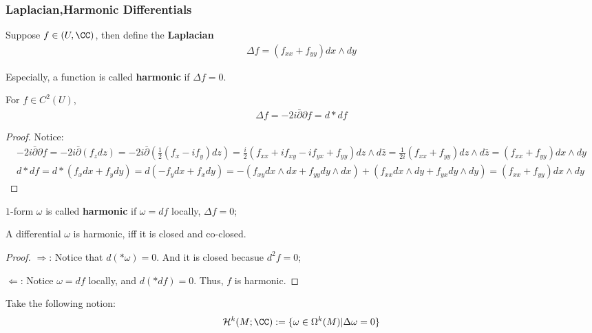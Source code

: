 \documentclass[Total.tex]{subfiles}
\begin{document}
		\subsubsection{Laplacian,Harmonic Differentials}
		\begin{Def}
			Suppose $f\in (U,\CC)$, then define the \textbf{Laplacian}
			\begin{gather*}
				\Delta f=(f_{xx}+f_{yy})dx\wedge dy
			\end{gather*}
			
			Especially, a function is called \textbf{harmonic} if $\Delta f=0$.
		\end{Def}
		
		\begin{proposition}
			For $f\in C^2(U)$,
			\begin{gather*}
				\Delta f=-2i \bar{\partial} \partial f=d*df
			\end{gather*}
		\end{proposition}
		\begin{proof}
			Notice:
			\begin{gather*}
				-2i\bar{\partial}\partial f=-2i\bar{\partial}(f_zdz)=-2i\bar{\partial}(\frac{1}{2}(f_x-if_y)dz)= \frac{i}{2}(f_{xx}+if_{xy}-if_{yx}+f_{yy})dz\wedge d\bar{z}=\frac{1}{2i} (f_{xx}+f_{yy})dz\wedge d\bar{z}=(f_{xx}+f_{yy})dx\wedge dy\\
				d*df=d*(f_xdx+f_ydy)=d(-f_ydx+f_x dy)=-(f_{xy}dx\wedge dx+f_{yy} dy\wedge dx)+(f_{xx}dx\wedge dy+f_{yx}dy\wedge dy)=(f_{xx}+f_{yy})dx\wedge dy
			\end{gather*}
		\end{proof}
		
		\begin{Def}
			$1$-form $\omega$ is called \textbf{harmonic} if $\omega=df$ locally, $\Delta f=0$;
		\end{Def}
		
		\begin{proposition}
			A differential $\omega$ is harmonic, iff it is closed and co-closed. 
		\end{proposition}
		\begin{proof}
			$\Rightarrow$: Notice that $d(*\omega)=0$. And it is closed becasue $d^2f=0$;
			
			$\Leftarrow$: Notice $\omega=df$ locally, and $d(*df)=0$. Thus, $f$ is harmonic. 
		\end{proof}
		
		\begin{Def}
			Take the following notion:
			\begin{gather*}
				\mathcal{H}^k(M;\CC):=\{\omega\in \Omega^k(M)|\Delta \omega=0\}
			\end{gather*}
		\end{Def}
\end{document}

